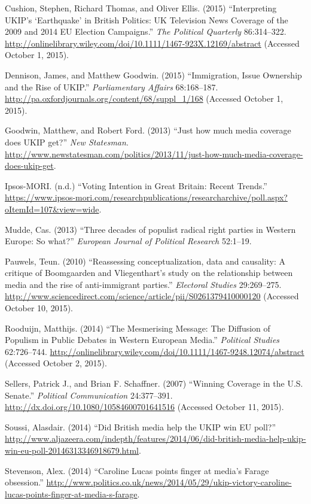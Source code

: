 \documentclass[12pt,article]{article}
\begin{document}
Cushion, Stephen, Richard Thomas, and Oliver Ellis. (2015)
``Interpreting UKIP's `Earthquake' in British Politics: UK Television
News Coverage of the 2009 and 2014 EU Election Campaigns.'' \emph{The
Political Quarterly} 86:314--322.
\url{http://onlinelibrary.wiley.com/doi/10.1111/1467-923X.12169/abstract}
(Accessed October 1, 2015).

Dennison, James, and Matthew Goodwin. (2015) ``Immigration, Issue
Ownership and the Rise of UKIP.'' \emph{Parliamentary Affairs}
68:168--187. \url{http://pa.oxfordjournals.org/content/68/suppl_1/168}
(Accessed October 1, 2015).

Goodwin, Matthew, and Robert Ford. (2013) ``Just how much media coverage
does UKIP get?'' \emph{New Statesman}.
\url{http://www.newstatesman.com/politics/2013/11/just-how-much-media-coverage-does-ukip-get}.

Ipsos-MORI. (n.d.) ``Voting Intention in Great Britain: Recent Trends.''
\url{https://www.ipsos-mori.com/researchpublications/researcharchive/poll.aspx?oItemId=107\&view=wide}.

Mudde, Cas. (2013) ``Three decades of populist radical right parties in
Western Europe: So what?'' \emph{European Journal of Political Research}
52:1--19.

Pauwels, Teun. (2010) ``Reassessing conceptualization, data and
causality: A critique of Boomgaarden and Vliegenthart's study on the
relationship between media and the rise of anti-immigrant parties.''
\emph{Electoral Studies} 29:269--275.
\url{http://www.sciencedirect.com/science/article/pii/S0261379410000120}
(Accessed October 10, 2015).

Rooduijn, Matthijs. (2014) ``The Mesmerising Message: The Diffusion of
Populism in Public Debates in Western European Media.'' \emph{Political
Studies} 62:726--744.
\url{http://onlinelibrary.wiley.com/doi/10.1111/1467-9248.12074/abstract}
(Accessed October 2, 2015).

Sellers, Patrick J., and Brian F. Schaffner. (2007) ``Winning Coverage
in the U.S. Senate.'' \emph{Political Communication} 24:377--391.
\url{http://dx.doi.org/10.1080/10584600701641516} (Accessed October 11,
2015).

Soussi, Alasdair. (2014) ``Did British media help the UKIP win EU
poll?''
\url{http://www.aljazeera.com/indepth/features/2014/06/did-british-media-help-ukip-win-eu-poll-20146313346918679.html}.

Stevenson, Alex. (2014) ``Caroline Lucas points finger at media's Farage
obsession.''
\url{http://www.politics.co.uk/news/2014/05/29/ukip-victory-caroline-lucas-points-finger-at-media-s-farage}.
\end{document}
